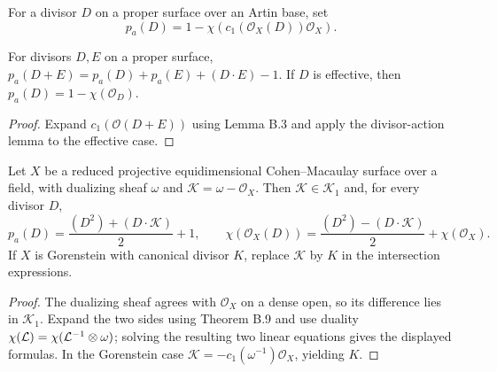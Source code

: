 \begin{definition}\label{kps-def-arithmetic-genus}
For a divisor $D$ on a proper surface over an Artin base, set
\[
 p_a(D)=1-\chi(c_1(\mathcal O_X(D))\mathcal O_X).
\]
\end{definition}

\begin{proposition}\label{kps-prop-arithmetic-genus}
For divisors $D,E$ on a proper surface,
$p_a(D+E)=p_a(D)+p_a(E)+(D\cdot E)-1$. If $D$ is effective, then
$p_a(D)=1-\chi(\mathcal O_D)$.
\end{proposition}
\begin{proof}
Expand $c_1(\mathcal O(D+E))$ using Lemma B.3 and apply the divisor-action
lemma to the effective case.
\end{proof}

\begin{proposition}\label{kps-prop-surface-RR}
Let $X$ be a reduced projective equidimensional Cohen--Macaulay surface over
a field, with dualizing sheaf $\omega$ and $\mathcal K=\omega-\mathcal O_X$.
Then $\mathcal K\in\mathcal K_1$ and, for every divisor $D$,
\[
 p_a(D)=\frac{(D^2)+(D\cdot\mathcal K)}2+1,\qquad
 \chi(\mathcal O_X(D))=\frac{(D^2)-(D\cdot\mathcal K)}2+\chi(\mathcal O_X).
\]
If $X$ is Gorenstein with canonical divisor $K$, replace $\mathcal K$ by
$K$ in the intersection expressions.
\end{proposition}
\begin{proof}
The dualizing sheaf agrees with $\mathcal O_X$ on a dense open, so its
difference lies in $\mathcal K_1$. Expand the two sides using Theorem B.9 and
use duality $\chi(\mathcal L)=\chi(\mathcal L^{-1}\otimes\omega)$; solving the
resulting two linear equations gives the displayed formulas. In the
Gorenstein case $\mathcal K=-c_1(\omega^{-1})\mathcal O_X$, yielding $K$.
\end{proof}

